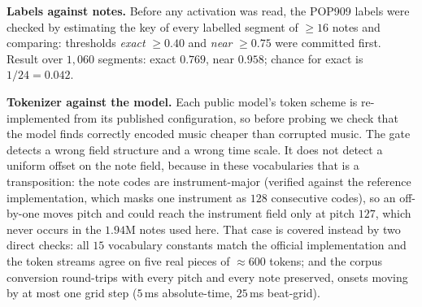 \documentclass{article}
\begin{document}
%
\textbf{Labels against notes.} Before any activation was read, the POP909 labels were
checked by estimating the key of every labelled segment of $\geq16$ notes and
comparing: thresholds \emph{exact} $\geq0.40$ and \emph{near} $\geq0.75$ were committed
first. Result over $1{,}060$ segments: exact $0.769$, near $0.958$; chance for exact is
$1/24=0.042$.

\textbf{Tokenizer against the model.} Each public model's token scheme is
re-implemented from its published configuration, so before probing we check that the
model finds correctly encoded music cheaper than corrupted music. The gate detects a
wrong field structure and a wrong time scale. It does not detect a uniform offset on
the note field, because in these vocabularies that is a transposition: the note codes
are instrument-major (verified against the reference implementation, which masks one
instrument as $128$ consecutive codes), so an off-by-one moves pitch and could reach
the instrument field only at pitch $127$, which never occurs in the $1.94$M notes used
here. That case is covered instead by two direct checks: all $15$ vocabulary constants
match the official implementation and the token streams agree on five real pieces of
$\approx600$ tokens; and the corpus conversion round-trips with every pitch and every
note preserved, onsets moving by at most one grid step ($5$\,ms absolute-time,
$25$\,ms beat-grid).
\end{document}
